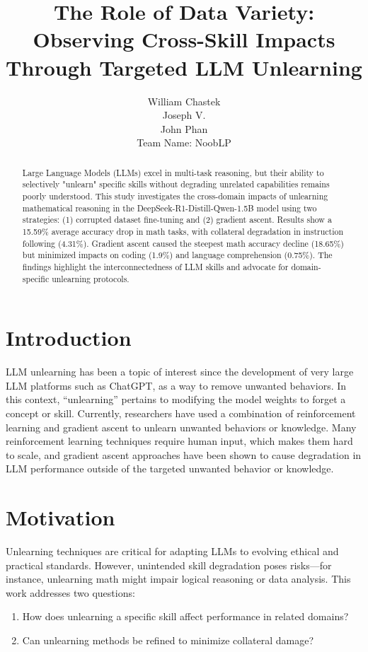 \documentclass[10pt]{article}
\title{The Role of Data Variety: Observing Cross-Skill Impacts Through Targeted LLM Unlearning}
\author{\textnormal{William Chastek} \\ Joseph V. \\ John Phan \\
Team Name: NoobLP}
\begin{document}
\maketitle

\begin{abstract}
Large Language Models (LLMs) excel in multi-task reasoning, but their ability to selectively "unlearn" specific skills without degrading unrelated capabilities remains poorly understood. This study investigates the cross-domain impacts of unlearning mathematical reasoning in the DeepSeek-R1-Distill-Qwen-1.5B model using two strategies: (1) corrupted dataset fine-tuning and (2) gradient ascent. Results show a 15.59\% average accuracy drop in math tasks, with collateral degradation in instruction following (4.31\%). Gradient ascent caused the steepest math accuracy decline (18.65\%) but minimized impacts on coding (1.9\%) and language comprehension (0.75\%). The findings highlight the interconnectedness of LLM skills and advocate for domain-specific unlearning protocols.
\end{abstract}

\section{Introduction}
LLM unlearning has been a topic of interest since the development of very large LLM platforms such as ChatGPT, as a way to remove unwanted behaviors. In this context, “unlearning” pertains to modifying the model weights to forget a concept or skill. Currently, researchers have used a combination of reinforcement learning \cite{mu2024rule} and gradient ascent \cite{neel2020descenttodeletegradientbasedmethodsmachine} to unlearn unwanted behaviors or knowledge. Many reinforcement learning techniques require human input, which makes them hard to scale, and gradient ascent approaches have been shown to cause degradation in LLM performance outside of the targeted unwanted behavior or knowledge. 

\section{Motivation}
Unlearning techniques are critical for adapting LLMs to evolving ethical and practical standards. However, unintended skill degradation poses risks—for instance, unlearning math might impair logical reasoning or data analysis. This work addresses two questions:
\begin{enumerate}
    \item How does unlearning a specific skill affect performance in related domains?
    \item Can unlearning methods be refined to minimize collateral damage?
\end{enumerate}
\end{document}
